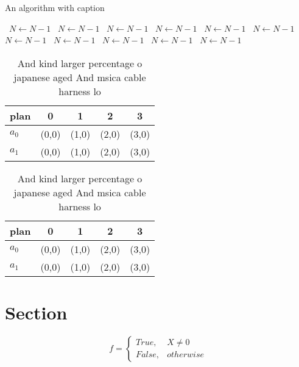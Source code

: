 \documentclass[a4paper]{article}
\begin{document}
\begin{algorithm}
\caption{An algorithm with caption}
\begin{algorithmic}
\    \State $N \gets N - 1$
\    \State $N \gets N - 1$
\    \State $N \gets N - 1$
\    \State $N \gets N - 1$
\    \State $N \gets N - 1$
\    \State $N \gets N - 1$
\    \State $N \gets N - 1$
\    \State $N \gets N - 1$
\    \State $N \gets N - 1$
\    \State $N \gets N - 1$
\    \State $N \gets N - 1$
\EndWhile
\end{algorithmic}
\end{algorithm}

\begin{table}
\begin{adjustbox}{width=0.5\columnwidth}
\begin{tabular}{|l|l|l|l|l|}
\hline
\textbf{plan} & \multicolumn{1}{c|}{\textbf{0}} & \multicolumn{1}{c|}{\textbf{1}} & \multicolumn{1}{c|}{\textbf{2}} & \multicolumn{1}{c|}{\textbf{3}} \\ \hline
\textbf{$a_0$}  & (0,0) & (1,0) & (2,0) & (3,0) \\ \hline
\textbf{$a_1$}  & (0,0) & (1,0) & (2,0) & (3,0) \\ \hline
\end{tabular}
\end{adjustbox}
\caption{And kind larger percentage o japanese aged And msica cable harness lo
}
\end{table}

\begin{table}
\begin{adjustbox}{width=0.5\columnwidth}
\begin{tabular}{|l|l|l|l|l|}
\hline
\textbf{plan} & \multicolumn{1}{c|}{\textbf{0}} & \multicolumn{1}{c|}{\textbf{1}} & \multicolumn{1}{c|}{\textbf{2}} & \multicolumn{1}{c|}{\textbf{3}} \\ \hline
\textbf{$a_0$}  & (0,0) & (1,0) & (2,0) & (3,0) \\ \hline
\textbf{$a_1$}  & (0,0) & (1,0) & (2,0) & (3,0) \\ \hline
\end{tabular}
\end{adjustbox}
\caption{And kind larger percentage o japanese aged And msica cable harness lo
}
\end{table}

\section{Section}

\begin{equation}   f =
\begin{cases} True, & X \neq 0\\
False, & otherwise
\end{cases}
\end{equation}
\end{document}
